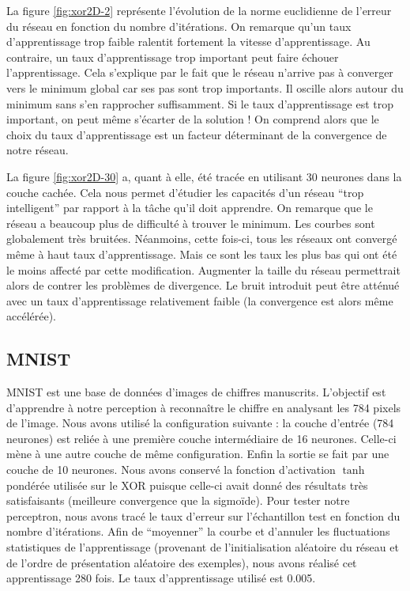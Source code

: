 La figure \ref{fig:xor2D-2} représente l'évolution de la norme euclidienne de l'erreur du réseau en fonction du nombre d'itérations. On remarque qu'un taux 
d'apprentissage trop faible ralentit fortement la vitesse d'apprentissage. Au contraire, un taux d'apprentissage trop important peut faire échouer l'apprentissage.
Cela s'explique par le fait que le réseau n'arrive pas à converger vers le minimum global car ses pas sont trop importants. Il oscille alors autour du minimum sans
s'en rapprocher suffisamment. Si le taux d'apprentissage est trop important, on peut même s'écarter de la solution ! On comprend alors que le choix du taux 
d'apprentissage est un facteur déterminant de la convergence de notre réseau.

La figure \ref{fig:xor2D-30} a, quant à elle, été tracée en utilisant 30 neurones dans la couche cachée. Cela nous permet d'étudier les capacités d'un réseau
``trop intelligent'' par rapport à la tâche qu'il doit apprendre. On remarque que le réseau a beaucoup plus de difficulté à trouver le minimum. Les courbes sont
globalement très bruitées. Néanmoins, cette fois-ci, tous les réseaux ont convergé même à haut taux d'apprentissage. Mais ce sont les taux les plus bas qui ont été
le moins affecté par cette modification. Augmenter la taille du réseau permettrait alors de contrer les problèmes de divergence. Le bruit introduit peut être atténué
avec un taux d'apprentissage relativement faible (la convergence est alors même accélérée).

\subsection{MNIST}

MNIST est une base de données d'images de chiffres manuscrits. L'objectif est d'apprendre à notre perception à reconnaître le chiffre en analysant les 784 pixels
de l'image. Nous avons utilisé la configuration suivante : la couche d'entrée (784 neurones) est reliée à une première couche intermédiaire de 16 neurones. Celle-ci
mène à une autre couche de même configuration. Enfin la sortie se fait par une couche de 10 neurones. Nous avons conservé la fonction d'activation $\tanh$ pondérée utilisée
sur le XOR puisque celle-ci avait donné des résultats très satisfaisants (meilleure convergence que la sigmoïde).
Pour tester notre perceptron, nous avons tracé le taux d'erreur sur l'échantillon test en fonction du nombre d'itérations. Afin de ``moyenner'' la courbe et 
d'annuler les fluctuations statistiques de l'apprentissage (provenant de l'initialisation aléatoire du réseau et de l'ordre de présentation aléatoire des exemples),
nous avons réalisé cet apprentissage 280 fois. Le taux d'apprentissage utilisé est 0.005.

